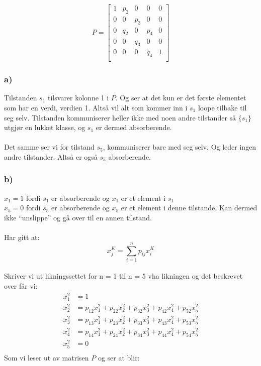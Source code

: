 \documentclass[a4paper, norsk, twoside, 10pt]{article}
\begin{document}
\begin{flushleft}
  \def\matrixPgen{
    \begin{bmatrix}
      1 & p_{2} & 0 & 0 & 0 \\
      0 & 0   & p_{3} & 0 & 0 \\
      0 & q_{2} & 0 & p_{4} & 0 \\
      0 & 0   & q_{3} & 0 & 0 \\
      0 & 0 & 0 & q_{4} & 1 \\
   \end{bmatrix}
  }
   \[P = \matrixPgen \]
   \subsubsection*{a)}
   Tilstanden $s_{1}$ tilsvarer kolonne 1 i $P$. Og ser at det kun er det første elementet som har en verdi, verdien 1. Altså vil alt som kommer inn i $s_{1}$ loope tilbake til seg selv. Tilstanden kommuniserer heller ikke med noen andre tilstander så $\{s_{1}\}$ utgjør en lukket klasse, og $s_{1}$ er dermed absorberende.\\
   \ \\
   Det samme ser vi for tilstand $s_{5}$, kommuniserer bare med seg selv. Og leder ingen andre tilstander. Altså er også $s_{5}$ absorberende.


   \subsubsection*{b)}
   $x_{1} = 1$ fordi $s_{1}$ er absorberende og $x_{1}$ er et element i $s_{1}$ \\
   $x_{5} = 0$ fordi $s_{5}$ er absorberende og $x_{5}$ er et element i denne tilstande. Kan dermed ikke ``unslippe'' og gå over til en annen tilstand. \\
   \ \\
   Har gitt at:
   \[x_{j}^{K} = \sum_{i = 1}^{n} p_{ij}x_{i}^{K}\]\\

   Skriver vi ut  likningssettet for n = 1 til n = 5 vha likningen og det beskrevet over får vi:
   \begin{align*}
     x_{1}^{2} &= 1 \\
     x_{2}^{2} &= p_{12}x_{1}^{2} + p_{22}x_{2}^{2} + p_{32}x_{3}^{2} + p_{42}x_{4}^{2} + p_{52}x_{5}^{2} \\
     x_{3}^{2} &= p_{13}x_{1}^{2} + p_{23}x_{2}^{2} + p_{33}x_{3}^{2} + p_{43}x_{4}^{2} + p_{53}x_{5}^{2} \\
     x_{4}^{2} &= p_{14}x_{1}^{2} + p_{24}x_{2}^{2} + p_{34}x_{3}^{2} + p_{44}x_{4}^{2} + p_{54}x_{5}^{2}\\
     x_{5}^{2} &= 0 \\
   \end{align*}
   Som vi leser ut av matrisen $P$ og ser at blir:


\end{flushleft}
\end{document}
